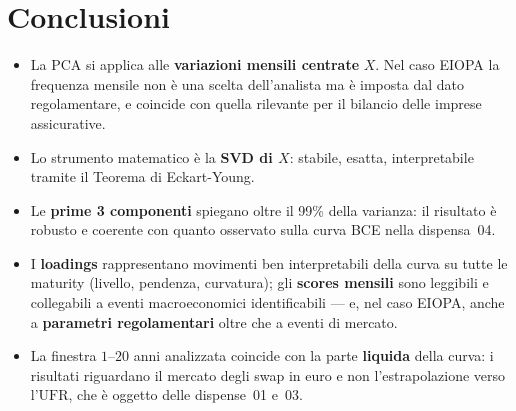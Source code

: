 \documentclass[11pt,a4paper]{article}
\newcommand{\UFR}{\ensuremath{\mathrm{UFR}}}
\theoremstyle{plain}
\theoremstyle{definition}
\theoremstyle{remark}
\begin{document}
\section{Conclusioni}

\begin{itemize}
  \item La PCA si applica alle \textbf{variazioni mensili centrate} $X$. Nel
        caso EIOPA la frequenza mensile non \`e una scelta dell'analista ma
        \`e imposta dal dato regolamentare, e coincide con quella rilevante
        per il bilancio delle imprese assicurative.
  \item Lo strumento matematico \`e la \textbf{SVD di $X$}: stabile, esatta,
        interpretabile tramite il Teorema di Eckart-Young.
  \item Le \textbf{prime 3 componenti} spiegano oltre il 99\% della varianza:
        il risultato \`e robusto e coerente con quanto osservato sulla curva
        BCE nella dispensa~04.
  \item I \textbf{loadings} rappresentano movimenti ben interpretabili della
        curva su tutte le maturity (livello, pendenza, curvatura); gli
        \textbf{scores mensili} sono leggibili e collegabili a eventi
        macroeconomici identificabili --- e, nel caso EIOPA, anche a
        \textbf{parametri regolamentari} oltre che a eventi di mercato.
  \item La finestra $1$--$20$ anni analizzata coincide con la parte
        \textbf{liquida} della curva: i risultati riguardano il mercato degli
        swap in euro e non l'estrapolazione verso l'$\UFR$, che \`e oggetto
        delle dispense~01 e~03.
\end{itemize}
\end{document}
